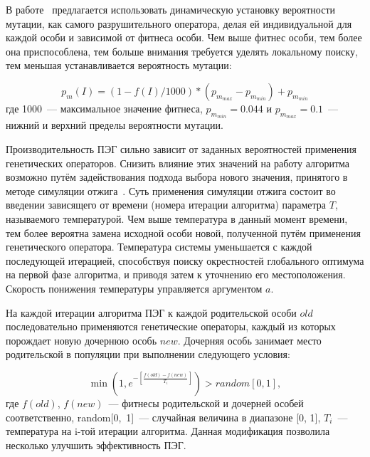 В работе~\cite{conf/dews/Tang06} предлагается использовать динамическую установку вероятности мутации, как самого разрушительного оператора, делая ей индивидуальной для каждой особи и зависимой от фитнеса особи. Чем выше фитнес особи, тем более она приспособлена, тем больше внимания требуется уделять локальному поиску, тем меньшая устанавливается вероятность мутации:

\begin{equation}
\label{eq:dynaminc_mutation_probability}
p_m(I) = (1 - f(I) / 1000)*(p_{m_{max}} - p_{m_{min}})+p_{m_{min}}
\end{equation}
где 1000~--- максимальное значение фитнеса, $p_{m_{min}}=0.044$ и $p_{m_{max}}=0.1$~--- нижний и верхний пределы вероятности мутации.

Производительность ПЭГ сильно зависит от заданных вероятностей применения генетических операторов. Снизить влияние этих значений на работу алгоритма возможно путём задействования подхода выбора нового значения, принятого в методе симуляции отжига~\cite{Siwei:2005:pICWCNMC}. Суть применения симуляции отжига состоит во введении зависящего от времени (номера итерации алгоритма) параметра $T$, называемого температурой. Чем выше температура в данный момент времени, тем более вероятна замена исходной особи новой, полученной путём применения генетического оператора. Температура системы уменьшается с каждой последующей итерацией, способствуя поиску окрестностей глобального оптимума на первой фазе алгоритма, и приводя затем к уточнению его местоположения. Скорость понижения температуры управляется аргументом $a$.

На каждой итерации алгоритма ПЭГ к каждой родительской особи $old$ последовательно применяются генетические операторы, каждый из которых порождает новую дочернюю особь $new$. Дочерняя особь занимает место родительской в популяции при выполнении следующего условия:

\begin{equation}
\label{eq:anneal_simulation}
\min(1, e^{-\left\lbrack\frac{f(old) - f(new)}{T_i}\right\rbrack}) > random[0, 1],
\end{equation}
где $f(old)$, $f(new)$~--- фитнесы родительской и дочерней особей соответственно, \mbox{random[0, 1]}~--- случайная величина в диапазоне [0, 1], $T_i$~--- температура на i-той итерации алгоритма. Данная модификация позволила несколько улучшить эффективность ПЭГ.






